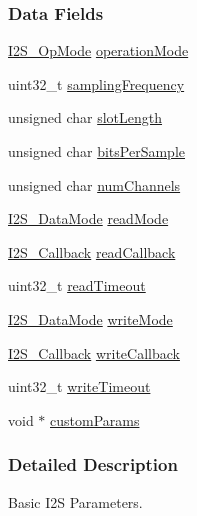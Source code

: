 \subsubsection*{Data Fields}
\begin{DoxyCompactItemize}
\item 
\hyperlink{_i2_s_8h_a1eb065ff9040979c9d6586c8d0df9ee0}{I2\+S\+\_\+\+Op\+Mode} \hyperlink{struct_i2_s___params_a4927bdc8e8cc29146f78f68ed2fed5f2}{operation\+Mode}
\item 
uint32\+\_\+t \hyperlink{struct_i2_s___params_aff5aa130ef087ebb86932182787c1df8}{sampling\+Frequency}
\item 
unsigned char \hyperlink{struct_i2_s___params_a82a7b2a0169d0104207814b069178029}{slot\+Length}
\item 
unsigned char \hyperlink{struct_i2_s___params_acbfd23bc8cd7e469cbf27d6431e43f7c}{bits\+Per\+Sample}
\item 
unsigned char \hyperlink{struct_i2_s___params_ad28849d1820321c2a5d5b4bb8dd83054}{num\+Channels}
\item 
\hyperlink{_i2_s_8h_a120b8555bc048186bbd436dbdbb5b405}{I2\+S\+\_\+\+Data\+Mode} \hyperlink{struct_i2_s___params_a52c33812ab184593d8dfe9cdb8f11f04}{read\+Mode}
\item 
\hyperlink{_i2_s_8h_af87c5d43590153717044a932ff6b2e03}{I2\+S\+\_\+\+Callback} \hyperlink{struct_i2_s___params_a94ed67cfe1320bd8daf013c132b907cc}{read\+Callback}
\item 
uint32\+\_\+t \hyperlink{struct_i2_s___params_a922986abc9bce28a05c6bc967a41a3ac}{read\+Timeout}
\item 
\hyperlink{_i2_s_8h_a120b8555bc048186bbd436dbdbb5b405}{I2\+S\+\_\+\+Data\+Mode} \hyperlink{struct_i2_s___params_a51ab14d450552a917fbadd8c91418ec5}{write\+Mode}
\item 
\hyperlink{_i2_s_8h_af87c5d43590153717044a932ff6b2e03}{I2\+S\+\_\+\+Callback} \hyperlink{struct_i2_s___params_a2cf905e275e93a49707613aedcb2ab9b}{write\+Callback}
\item 
uint32\+\_\+t \hyperlink{struct_i2_s___params_ae42c67f2e240e631a7d4944aa36e0050}{write\+Timeout}
\item 
void $\ast$ \hyperlink{struct_i2_s___params_afb40d7bc5be946e387d5a0af93525d64}{custom\+Params}
\end{DoxyCompactItemize}


\subsubsection{Detailed Description}
Basic I2\+S Parameters. 

